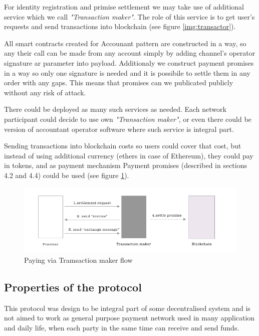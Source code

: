 \documentclass[a4paper,12pt]{article}
\begin{document}
For identity registration and primise settlement we may take use of additional
service which we call \textit{"Transaction maker"}. The role of this service is 
to get user's requests and send transactions into blockchain (see figure 
\ref{img:transactor}).

All smart contracts created for Accounant pattern are constructed in a way, so
any their call can be made from any account simply by adding channel's operator
signature ar parameter into payload. Additionaly we construct payment promises 
in a way so only one signature is needed and it is possibile to settle them in 
any order with any gaps. This means that promises can we publicated publicly
without any risk of attack.

There could be deployed as many such services as needed.
Each network participant could decide to use own \textit{"Transaction maker"},
or even there could be version of accountant operator software where such 
service is integral part.

Sending transactions into blockchain costs so users could cover that cost, but
instead of using additional currency (ethers in case of Ethereum), they could
pay in tokens, and as payment mechanism Payment promises (described in sections
4.2 and 4.4) could be used (see figure \ref{img:transactor-payment}).

\begin{figure}[H]
    \centering
    \includegraphics[scale=0.5]{img/transactor-payment}
    \caption{Paying via Tramsaction maker flow}
    \label{img:transactor-payment}
\end{figure}

\subsection{Properties of the protocol}

This protocol was design to be integral part of some decentralised system and 
is not aimed to work as general purpose payment network used in many 
application and daily life, when each party in the same time can receive and 
send funds. 
\end{document}
